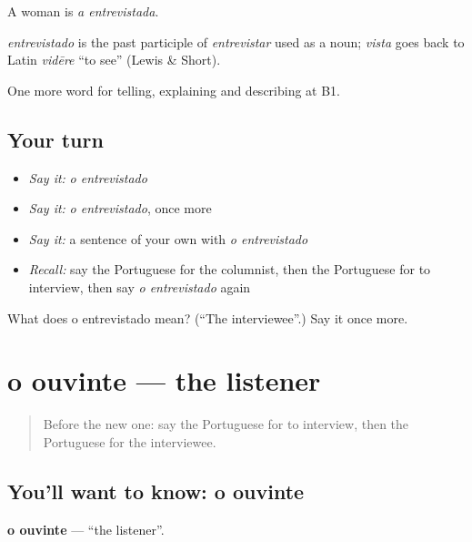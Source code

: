 A woman is \emph{a entrevistada}.

\begin{cousinweb}
\emph{entrevistado} is the past participle of \emph{entrevistar} used as a noun; \emph{vista} goes back to Latin \emph{vidēre} \textquotedblleft{}to see\textquotedblright{} (Lewis \& Short).
\end{cousinweb}

\begin{grammarlens}[title={What you've built}]
One more word for telling, explaining and describing at B1.
\end{grammarlens}

\subsection*{Your turn}
\begin{itemize}
\raggedright
  \item \emph{Say it:} \emph{o entrevistado}
  \item \emph{Say it:} \emph{o entrevistado}, once more
  \item \emph{Say it:} a sentence of your own with \emph{o entrevistado}
  \item \emph{Recall:} say the Portuguese for the columnist, then the Portuguese for to interview, then say \emph{o entrevistado} again
\end{itemize}

\begin{tcolorbox}[breakable,colback=teal!4,colframe=teal!35!black,title={Before you move on}]
What does o entrevistado mean? (\textquotedblleft{}The interviewee\textquotedblright{}.) Say it once more.
\end{tcolorbox}
\section[o ouvinte]{o ouvinte — the listener}

\label{lesson:PT-C285-ouvinte}



\begin{quote}
Before the new one: say the Portuguese for to interview, then the Portuguese for the interviewee.
\end{quote}

\subsection*{You'll want to know: o ouvinte}
\textbf{o ouvinte} — \textquotedblleft{}the listener\textquotedblright{}.

